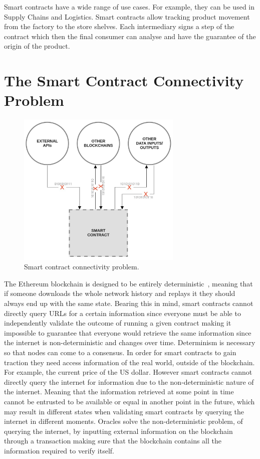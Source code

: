 Smart contracts have a wide range of use cases. For example, they can be used in Supply Chains and Logistics. Smart contracts allow tracking product movement from the factory to the store shelves. Each intermediary signs a step of the contract which then the final consumer can analyse and have the guarantee of the origin of the product.

\section{The Smart Contract Connectivity Problem}

\begin{figure}[t]
  \begin{center}
    \leavevmode
    \includegraphics[width=0.7\textwidth]{figures/sc_connectivity.jpg}
    \caption{Smart contract connectivity problem.}
    \label{fig:/figures/sc_connectivity.jpg}
  \end{center}
\end{figure}

The Ethereum blockchain is designed to be entirely deterministic~\cite{GavinWood2014Ethereum:Ledger}, meaning that if someone downloads the whole network history and replays it they should always end up with the same state. Bearing this in mind, smart contracts cannot directly query URLs for a certain information since everyone must be able to independently validate the outcome of running a given contract making it impossible to guarantee that everyone would retrieve the same information since the internet is non-deterministic and changes over time. Determinism is necessary so that nodes can come to a consensus. In order for smart contracts to gain traction they need access information of the real world, outside of the blockchain. For example, the current price of the US dollar. However smart contracts cannot directly query the internet for information due to the non-deterministic nature of the internet. Meaning that the information retrieved at some point in time cannot be entrusted to be available or equal in another point in the future, which may result in different states when validating smart contracts by querying the internet in different moments. Oracles solve the non-deterministic problem, of querying the internet, by inputting external information on the blockchain through a transaction making sure that the blockchain contains all the information required to verify itself. 



